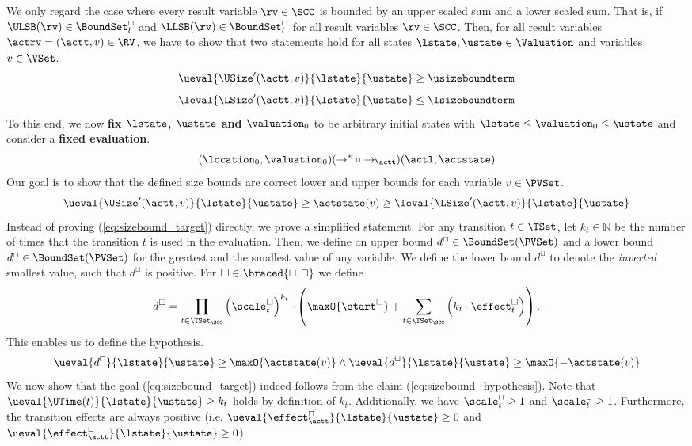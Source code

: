 We only regard the case where every result variable $\rv \in \SCC$ is bounded by an upper scaled sum and a lower scaled sum.
That is, if $\ULSB(\rv) \in \BoundSet^\sqcap_l$ and $\LLSB(\rv) \in \BoundSet^\sqcup_l$ for all result variables $\rv \in \SCC$.
Then, for all result variables $\actrv = (\actt, v) \in \RV$, we have to show that two statements hold for all states $\lstate, \ustate \in \Valuation$ and variables $v \in \VSet$.
\[ \ueval{\USize'(\actt, v)}{\lstate}{\ustate} \geq \usizeboundterm \]
\[ \leval{\LSize'(\actt, v)}{\lstate}{\ustate} \leq \lsizeboundterm \]
To this end, we now \textbf{fix $\lstate$, $\ustate$ and $\valuation_0$} to be arbitrary initial states with $\lstate \leq \valuation_0 \leq \ustate$ and consider a \textbf{fixed evaluation}.
\[ (\location_0, \valuation_0) (\rightarrow^* \circ \rightarrow_\actt) (\actl, \actstate) \]
Our goal is to show that the defined size bounds are correct lower and upper bounds for each variable $v \in \PVSet$.
\begin{equation} \label{eq:sizebound_target}
  \ueval{\USize'(\actt, v)}{\lstate}{\ustate} \geq \actstate(v) \geq \leval{\LSize'(\actt, v)}{\lstate}{\ustate}
\end{equation}
Instead of proving (\ref{eq:sizebound_target}) directly, we prove a simplified statement.
For any transition $t \in \TSet$, let $k_t \in \mathbb{N}$ be the number of times that the transition $t$ is used in the evaluation.
Then, we define an upper bound $d^\sqcap \in \BoundSet(\PVSet)$ and a lower bound $d^\sqcup \in \BoundSet(\PVSet)$ for the greatest and the smallest value of any variable.
We define the lower bound $d^\sqcup$ to denote the \emph{inverted} smallest value, such that $d^\sqcup$ is positive.
For $\square \in \braced{\sqcup, \sqcap}$ we define
\[ d^\square = \prod_{t \in \TSet_\SCC} \left( \scale^\square_t \right)^{k_t} \cdot \left( \maxO{\start^\square} + \sum_{t \in \TSet_\SCC} \left( k_t \cdot \effect^\square_t \right) \right). \]
This enables us to define the hypothesis.
\begin{equation} \label{eq:sizebound_hypothesis}
  \ueval{d^\sqcap}{\lstate}{\ustate} \geq \maxO{\actstate(v)} \wedge \ueval{d^\sqcup}{\lstate}{\ustate} \geq \maxO{-\actstate(v)}
\end{equation}
We now show that the goal (\ref{eq:sizebound_target}) indeed follows from the claim (\ref{eq:sizebound_hypothesis}).
Note that $\ueval{\UTime(t)}{\lstate}{\ustate} \geq k_t$ holds by definition of $k_t$.
Additionally, we have $\scale^\sqcap_t \geq 1$ and $\scale^\sqcup_t \geq 1$.
Furthermore, the transition effects are always positive (i.e. $\ueval{\effect^\sqcap_\actt}{\lstate}{\ustate} \geq 0$ and $\ueval{\effect^\sqcup_\actt}{\lstate}{\ustate} \geq 0$).
